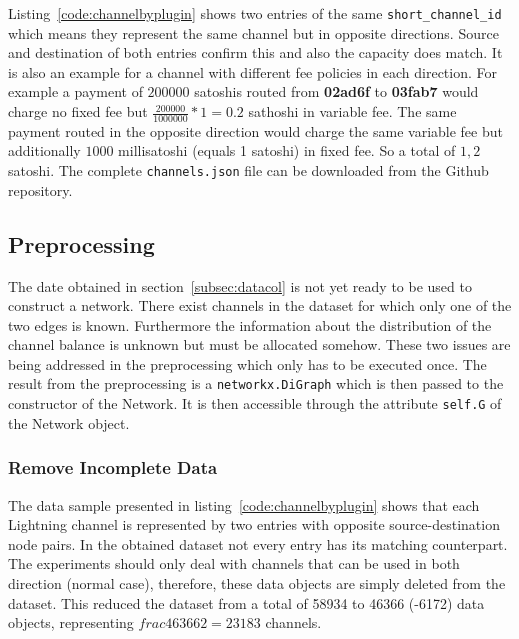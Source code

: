 \documentclass[final]{fhnwreport}       %
\begin{document}
Listing~\ref{code:channelbyplugin} shows two entries of the same \texttt{short\_channel\_id} which means they represent the same channel but in opposite directions. Source and destination of both entries confirm this and also the capacity does match. It is also an example for a channel with different fee policies in each direction. For example a payment of $200000$ satoshis routed from \textbf{02ad6f} to \textbf{03fab7} would charge no fixed fee but $\frac{200000}{1000000}*1 = 0.2$ sathoshi in variable fee. The same payment routed in the opposite direction would charge the same variable fee but additionally $1000$ millisatoshi (equals 1 satoshi) in fixed fee. So a total of $1,2$ satoshi. The complete \texttt{channels.json} file can be downloaded from the Github repository. 

\subsection{Preprocessing}\label{subsec:preproc}
The date obtained in section~\ref{subsec:datacol} is not yet ready to be used to construct a network. There exist channels in the dataset for which only one of the two edges is known. Furthermore the information about the distribution of the channel balance is unknown but must be allocated somehow. These two issues are being addressed in the preprocessing which only has to be executed once. The result from the preprocessing is a \texttt{networkx.DiGraph} which is then passed to the constructor of the Network. It is then accessible through the attribute \texttt{self.G} of the Network object.

\subsubsection{Remove Incomplete Data}
The data sample presented in listing~\ref{code:channelbyplugin} shows that each Lightning channel is represented by two entries with opposite source-destination node pairs. In the obtained dataset not every entry has its matching counterpart. The experiments should only deal with channels that can be used in both direction (normal case), therefore, these data objects are simply deleted from the dataset. This reduced the dataset from a total of 58934 to 46366 (-6172) data objects, representing $frac{46366}{2}=23183$ channels.  
\end{document}
